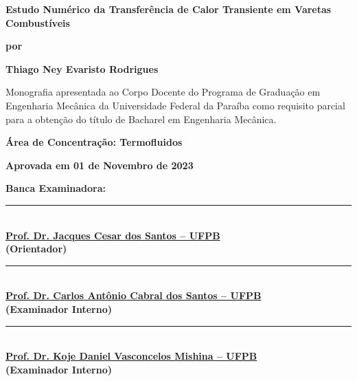 \thispagestyle{empty}

\begin{center}
    {\Large
    \textbf{Estudo Numérico da Transferência de Calor Transiente em Varetas Combustíveis}}
    
    \vspace{1.0cm}
    
    \textbf{por}
    
    \vspace{1.0cm}
    
    {\large
    \bf{Thiago Ney Evaristo Rodrigues}}
\end{center}

\vspace{1.0cm}

Monografia apresentada ao Corpo Docente do Programa de
Graduação em Engenharia Mecânica da Universidade Federal da Paraíba
como requisito parcial para a obtenção do título de Bacharel em
Engenharia Mecânica.

\vspace{1.0cm}

\noindent \textbf{Área de Concentração: Termofluidos}

\vspace{1.0cm}

\noindent \textbf{Aprovada em 01 de Novembro de 2023}

\vspace{1.0cm}

\noindent \textbf{Banca Examinadora:}

\vspace{0.7cm}

\begin{center}
 
     \rule{10cm}{.1mm} \\
     \href{http://lattes.cnpq.br/3095303507056273}
     {\textbf{Prof. Dr. Jacques Cesar dos Santos -- UFPB}} \\
     \textbf{(Orientador)}
     
     \vspace{1cm}
     
     \rule{10cm}{.1mm} \\
     \href{http://lattes.cnpq.br/9774109887296955}
     {\textbf{Prof. Dr. Carlos Antônio Cabral dos Santos -- UFPB}} \\
     \textbf{(Examinador Interno)}
     
     \vspace{1cm}
    
     \rule{10cm}{.1mm} \\
     \href{http://lattes.cnpq.br/7594014327071745}
     {\textbf{Prof. Dr. Koje Daniel Vasconcelos Mishina  -- UFPB}} \\
     \textbf{(Examinador Interno)}

\end{center}